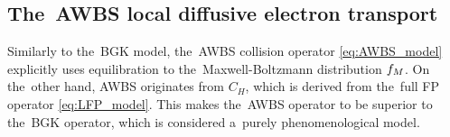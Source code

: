 \subsection{The~AWBS local diffusive electron transport}
\label{sec:AWBSDiffusiveRegime}
Similarly to the~BGK model, the~AWBS collision operator \ref{eq:AWBS_model} 
explicitly uses equilibration to the~Maxwell-Boltzmann distribution $f_M$. 
On the~other hand, AWBS originates from $C_H$, which is derived from 
the~full FP operator \eqref{eq:LFP_model}. This makes the~AWBS operator 
to be superior to the~BGK operator, which is considered a~purely
phenomenological model.

